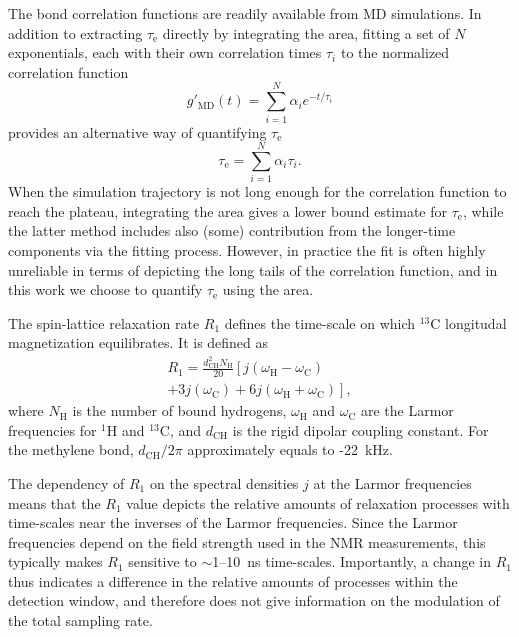 \documentclass[journal=jpcbfk,manuscript=article,layout=twocolumn]{achemso}
\begin{document}
The bond correlation functions are readily available from MD simulations. In addition to extracting $\tau_\mathrm{e}$ directly by integrating the area, fitting a set of $N$ exponentials, each with their own correlation times $\tau_{i}$ to the normalized correlation function 
\begin{equation}
g'_\mathrm{MD}(t)=\sum_{i=1}^{N}\alpha_{i}e^{-t/\tau_{i}}
\end{equation}
provides an alternative way of quantifying $\tau_\mathrm{e}$ 
\begin{equation}
\tau_\mathrm{e}=\sum_{i=1}^{N}\alpha_{i}\tau_{i} .
\end{equation}
When the simulation trajectory is not long enough for the correlation function to reach the plateau, integrating the area gives a lower bound estimate for $\tau_\mathrm{e}$, while the latter method includes also (some) contribution from the longer-time components via the fitting process.
However, in practice the fit is often highly unreliable in terms of depicting the long tails of the correlation function, and in this work we choose to quantify $\tau_\mathrm{e}$ using the area.

The spin-lattice relaxation rate $R_1$ defines the time-scale on which $^{13}$C longitudal magnetization equilibrates. It is defined as  
\begin{equation}
\label{eq:R1}
\begin{aligned}
R_{1}=\frac{d^2_{\mathrm{CH}}N_{\mathrm{H}}}{20}\left[j(\omega_{\mathrm{H}}-\omega_{\mathrm{C}})\right. \\
\left.+3j(\omega_{\mathrm{C}})+6j(\omega_{\mathrm{H}}+\omega_{\mathrm{C}})\right] ,
\end{aligned}
\end{equation}
where $N_{\mathrm{H}}$ is the number of bound hydrogens, $\omega_{\mathrm{H}}$ and $\omega_{\mathrm{C}}$ are the Larmor frequencies for $^{1}$H and $^{13}$C, and $d_{\mathrm{CH}}$ is the rigid dipolar coupling constant. For the methylene bond, $d_{\mathrm{CH}}/2\pi$ approximately equals to -22~kHz.


The dependency of $R_{1}$ on the spectral densities $j$ at the Larmor frequencies means that the $R_{1}$ value depicts the relative amounts of relaxation processes with time-scales near the inverses of the Larmor frequencies. Since the Larmor frequencies depend on the field strength used in the NMR measurements, this typically makes $R_{1}$ sensitive to $\sim$1--10~ns time-scales. Importantly, a change in $R_{1}$ thus indicates a difference in the relative amounts of processes within the detection window, and therefore does not give information on the modulation of the total sampling rate.  
\end{document}
